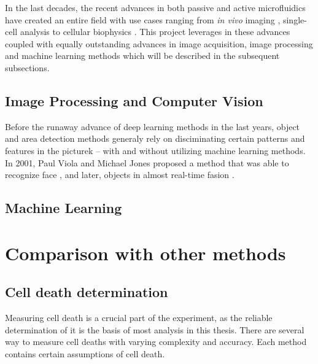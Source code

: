 \documentclass[pdftex,12pt,a4paper]{report}
\begin{document}
In the last decades, the recent advances in both passive and active microfluidics have created an entire field \cite{whitesides2006origins} with use cases ranging from \textit{in vivo} imaging \cite{chronis2007microfluidics}, single-cell analysis \cite{wheeler2003microfluidic} to cellular biophysics \cite{di2010bacterial}. This project leverages in these advances coupled with equally outstanding advances in image acquisition, image processing and machine learning methods which will be described in the subsequent subsections.

\subsection{Image Processing and Computer Vision}

\label{subsection:cv_advances}

Before the runaway advance of deep learning methods in the last years, object and area detection methods generaly rely on disciminating certain patterns and features in the picturek -- with and without utilizing machine learning methods. In 2001, Paul Viola and Michael Jones proposed a method that was able to recognize face \cite{viola2004robust}, and later, objects in almost real-time fasion \cite{viola2001rapid}. %


\subsection{Machine Learning}

\label{subsection:ml_advances}


\section{Comparison with other methods}

\subsection{Cell death determination}
\label{subsection:comp_cell_death_determination}

Measuring cell death is a crucial part of the experiment, as the reliable determination of it is the basis of most analysis in this thesis. There are several way to measure cell deaths with varying complexity and accuracy. Each method contains certain assumptions of cell death.\\
\end{document}
